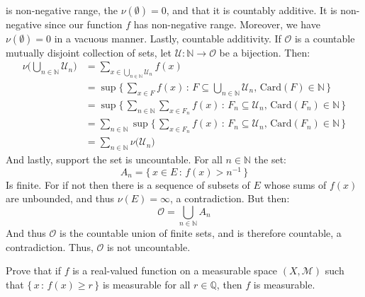 \documentclass[crop=false,class=article]{standalone}                       %
\begin{document}
\begin{solution}
        is non-negative range, the $\nu(\emptyset)=0$, and that it is
        countably additive. It is non-negative since our function $f$ has
        non-negative range. Moreover, we have $\nu(\emptyset)=0$ in a
        vacuous manner. Lastly, countable additivity. If $\mathcal{O}$
        is a countable mutually disjoint collection of sets, let
        $\mathcal{U}:\mathbb{N}\rightarrow\mathcal{O}$ be a bijection.
        Then:
        \begin{subequations}
            \begin{align}
                \nu\Big(\bigcup_{n\in\mathbb{N}}\mathcal{U}_{n}\Big)
                &=\sum_{x\in\bigcup_{n\in\mathbb{N}}\mathcal{U}_{n}}f(x)\\
                &=\sup\Big\{\,\sum_{x\in{F}}f(x)\,:\,
                    F\subseteq\bigcup_{n\in\mathbb{N}}\mathcal{U}_{n},\,
                    \textrm{Card}(F)\in\mathbb{N}\,\Big\}\\
                &=\sup\Big\{\,\sum_{n\in\mathbb{N}}
                    \sum_{x\in{F}_{n}}f(x)\,:\,
                    F_{n}\subseteq\mathcal{U}_{n},\,
                    \textrm{Card}(F_{n})\in\mathbb{N}\,\Big\}\\
                &=\sum_{n\in\mathbb{N}}
                    \sup\Big\{\,\sum_{x\in{F}_{n}}f(x)\,:\,
                        F_{n}\subseteq\mathcal{U}_{n},\,
                        \textrm{Card}(F_{n})\in\mathbb{N}\,\Big\}\\
                &=\sum_{n\in\mathbb{N}}\nu\big(\mathcal{U}_{n}\big)
            \end{align}
        \end{subequations}
        And lastly, support the set is uncountable. For all $n\in\mathbb{N}$
        the set:
        \begin{equation}
            A_{n}=\{\,x\in{E}\,:\,f(x)>n^{\minus{1}}\,\}
        \end{equation}
        Is finite. For if not then there is a sequence of subsets of
        $E$ whose sums of $f(x)$ are unbounded, and thus $\nu(E)=\infty$,
        a contradiction. But then:
        \begin{equation}
            \mathcal{O}=\bigcup_{n\in\mathbb{N}}A_{n}
        \end{equation}
        And thus $\mathcal{O}$ is the countable union of finite sets, and
        is therefore countable, a contradiction. Thus, $\mathcal{O}$ is
        not uncountable.
    \end{solution}
    \begin{problem}
        Prove that if $f$ is a real-valued function on a measurable
        space $(X,\mathcal{M})$ such that $\{\,x\,:\,f(x)\geq{r}\,\}$
        is measurable for all $r\in\mathbb{Q}$, then $f$ is measurable.
    \end{problem}
\end{document}
